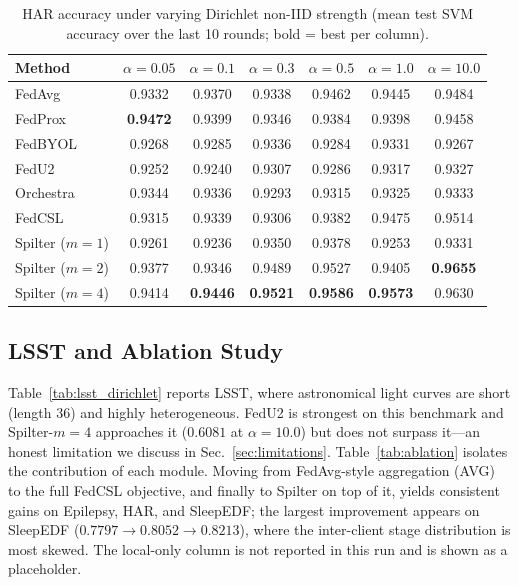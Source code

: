 \documentclass[sigconf]{acmart}
\begin{document}
\begin{table}[t]
  \centering
  \caption{HAR accuracy under varying Dirichlet non-IID strength (mean test SVM
  accuracy over the last 10 rounds; bold = best per column).}
  \label{tab:har_dirichlet}
  \begin{tabular}{lcccccc}
    \toprule
    Method & $\alpha{=}0.05$ & $\alpha{=}0.1$ & $\alpha{=}0.3$ & $\alpha{=}0.5$ & $\alpha{=}1.0$ & $\alpha{=}10.0$ \\
    \midrule
    FedAvg            & 0.9332 & 0.9370 & 0.9338 & 0.9462 & 0.9445 & 0.9484 \\
    FedProx           & \textbf{0.9472} & 0.9399 & 0.9346 & 0.9384 & 0.9398 & 0.9458 \\
    FedBYOL           & 0.9268 & 0.9285 & 0.9336 & 0.9284 & 0.9331 & 0.9267 \\
    FedU2             & 0.9252 & 0.9240 & 0.9307 & 0.9286 & 0.9317 & 0.9327 \\
    Orchestra         & 0.9344 & 0.9336 & 0.9293 & 0.9315 & 0.9325 & 0.9333 \\
    FedCSL            & 0.9315 & 0.9339 & 0.9306 & 0.9382 & 0.9475 & 0.9514 \\
    \midrule
    Spilter ($m{=}1$) & 0.9261 & 0.9236 & 0.9350 & 0.9378 & 0.9253 & 0.9331 \\
    Spilter ($m{=}2$) & 0.9377 & 0.9346 & 0.9489 & 0.9527 & 0.9405 & \textbf{0.9655} \\
    Spilter ($m{=}4$) & 0.9414 & \textbf{0.9446} & \textbf{0.9521} & \textbf{0.9586} & \textbf{0.9573} & 0.9630 \\
    \bottomrule
  \end{tabular}
\end{table}

\subsection{LSST and Ablation Study}

Table~\ref{tab:lsst_dirichlet} reports LSST, where astronomical light curves are
short (length 36) and highly heterogeneous. FedU2 is strongest on this benchmark
and Spilter-$m{=}4$ approaches it ($0.6081$ at $\alpha=10.0$) but does not
surpass it---an honest limitation we discuss in Sec.~\ref{sec:limitations}.
Table~\ref{tab:ablation} isolates the contribution of each module. Moving from
FedAvg-style aggregation (AVG) to the full FedCSL objective, and finally to
Spilter on top of it, yields consistent gains on Epilepsy, HAR, and SleepEDF; the
largest improvement appears on SleepEDF
($0.7797\rightarrow0.8052\rightarrow0.8213$), where the inter-client stage
distribution is most skewed. The local-only column is not reported in this run
and is shown as a placeholder.
\end{document}
